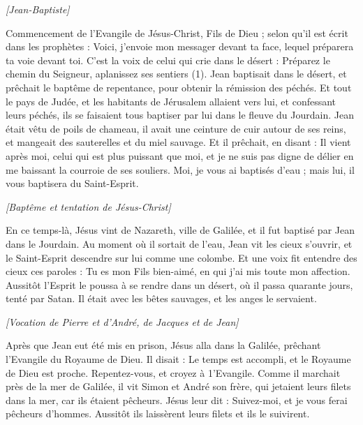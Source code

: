 \BFont
\begin{multicols}{2}
\begin{center}
\textit{[Jean-Baptiste]}
\end{center}
\VerseOne{}Commencement de l'Evangile de Jésus-Christ, Fils de Dieu ;
selon qu'il est écrit dans les prophètes : Voici, j'envoie mon messager devant ta face, lequel préparera ta voie devant toi.
C’est la voix de celui qui crie dans le désert : Préparez le chemin du Seigneur, aplanissez ses sentiers (1).
Jean baptisait dans le désert, et prêchait le baptême de repentance, pour obtenir la rémission des péchés.
Et tout le pays de Judée, et les habitants de Jérusalem allaient vers lui, et confessant leurs péchés, ils se faisaient tous baptiser par lui dans le fleuve du Jourdain.
Jean était vêtu de poils de chameau, il avait une ceinture de cuir autour de ses reins, et mangeait des sauterelles et du miel sauvage.
Et il prêchait, en disant : Il vient après moi, celui qui est plus puissant que moi, et je ne suis pas digne de délier en me baissant la courroie de ses souliers.
Moi, je vous ai baptisés d'eau ; mais lui, il vous baptisera du Saint-Esprit.
\begin{center}
\textit{[Baptême et tentation de Jésus-Christ]}
\end{center}
\PPE{}
En ce temps-là, Jésus vint de Nazareth, ville de Galilée, et il fut baptisé par Jean dans le Jourdain.
Au moment où il sortait de l'eau, Jean vit les cieux s’ouvrir, et le Saint-Esprit descendre sur lui comme une colombe.
Et une voix fit entendre des cieux ces paroles : Tu es mon Fils bien-aimé, en qui j'ai mis toute mon affection.
Aussitôt l'Esprit le poussa à se rendre dans un désert,
où il passa quarante jours, tenté par Satan. Il était avec les bêtes sauvages, et les anges le servaient.
\begin{center}
\textit{[Vocation de Pierre et d'André, de Jacques et de Jean]}
\end{center}
\PPE{}
Après que Jean eut été mis en prison, Jésus alla dans la Galilée, prêchant l'Evangile du Royaume de Dieu.
Il disait : Le temps est accompli, et le Royaume de Dieu est proche. Repentez-vous, et croyez à 1'Evangile.
Comme il marchait près de la mer de Galilée, il vit Simon et André son frère, qui jetaient leurs filets dans la mer, car ils étaient pêcheurs.
Jésus leur dit : Suivez-moi, et je vous ferai pêcheurs d'hommes.
Aussitôt ils laissèrent leurs filets et ils le suivirent.

\end{multicols}

